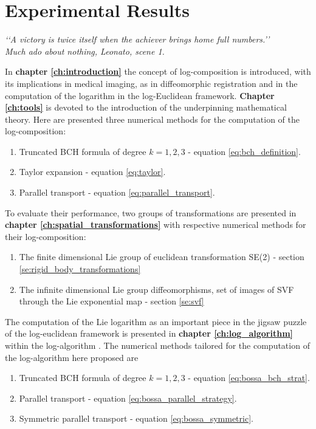 \chapter{Experimental Results}\label{ch:results}

\begin{flushright}
	\emph{\lq\lq A victory is twice itself when the achiever brings home full numbers.\rq\rq \\
		       \emph{Much ado about nothing}, Leonato, scene 1.}
\end{flushright}

\vspace{0.6cm}

In {\bf chapter \ref{ch:introduction}} the concept of log-composition is introduced, with its implications in medical imaging, as in diffeomorphic registration and in the computation of the logarithm in the log-Euclidean framework. 
{\bf Chapter \ref{ch:tools}} is devoted to the introduction of the underpinning mathematical theory. Here are presented three numerical methods for the computation of the log-composition:
\begin{enumerate}
	\item Truncated BCH formula of degree $k=1,2,3$ - equation \ref{eq:bch_definition}.
	\item Taylor expansion - equation \ref{eq:taylor}.
	\item Parallel transport - equation \ref{eq:parallel_transport}.
\end{enumerate}
To evaluate their performance, two groups of transformations are presented in {\bf chapter \ref{ch:spatial_transformations}} with respective numerical methods for their log-composition:
\begin{enumerate}
	\item The finite dimensional Lie group of euclidean transformation SE(2) - section \ref{se:rigid_body_transformations}
	\item The infinite dimensional Lie group diffeomorphisms, set of images of SVF through the Lie exponential map - section \ref{se:svf}
\end{enumerate}

The computation of the Lie logarithm as an important piece in the jigsaw puzzle of the log-euclidean framework is presented in {\bf chapter \ref{ch:log_algorithm}} within the log-algorithm \cite{Bossa:08}. 
The numerical methods tailored for the computation of the log-algorithm here proposed are
\begin{enumerate}
	\item Truncated BCH formula of degree $k=1,2,3$ - equation \ref{eq:bossa_bch_strat}.
	\item Parallel transport - equation \ref{eq:bossa_parallel_strategy}.
	\item Symmetric parallel transport - equation \ref{eq:bossa_symmetric}.
\end{enumerate}

